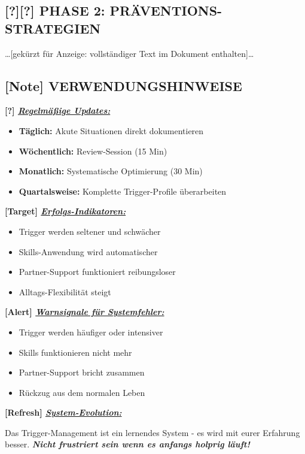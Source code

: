 \hypertarget{phase-2-pruxe4ventions-strategien}{%
\subsection{\texorpdfstring{[?][?] \textbf{PHASE 2: PRÄVENTIONS-STRATEGIEN}}{[?][?] PHASE 2: PRÄVENTIONS-STRATEGIEN}}\label{phase-2-pruxe4ventions-strategien}}

\ldots{[}gekürzt für Anzeige: vollständiger Text im Dokument enthalten{]}\ldots{}

\hypertarget{verwendungshinweise}{%
\subsection{\texorpdfstring{[Note] \textbf{VERWENDUNGSHINWEISE}}{[Note] VERWENDUNGSHINWEISE}}\label{verwendungshinweise}}

\textbf{[?] \emph{\ul{Regelmäßige Updates:}}}

\begin{itemize}
\tightlist
\item
  \textbf{Täglich:} Akute Situationen direkt dokumentieren
\item
  \textbf{Wöchentlich:} Review-Session (15 Min)
\item
  \textbf{Monatlich:} Systematische Optimierung (30 Min)
\item
  \textbf{Quartalsweise:} Komplette Trigger-Profile überarbeiten
\end{itemize}

\textbf{[Target] \emph{\ul{Erfolgs-Indikatoren:}}}

\begin{itemize}
\tightlist
\item
  Trigger werden seltener und schwächer
\item
  Skills-Anwendung wird automatischer
\item
  Partner-Support funktioniert reibungsloser
\item
  Alltags-Flexibilität steigt
\end{itemize}

\textbf{[Alert] \emph{\ul{Warnsignale für Systemfehler:}}}

\begin{itemize}
\tightlist
\item
  Trigger werden häufiger oder intensiver
\item
  Skills funktionieren nicht mehr
\item
  Partner-Support bricht zusammen
\item
  Rückzug aus dem normalen Leben
\end{itemize}

\textbf{[Refresh] \emph{\ul{System-Evolution:}}}

Das Trigger-Management ist ein lernendes System - es wird mit eurer Erfahrung besser. \emph{\textbf{Nicht frustriert sein wenn es anfangs holprig läuft!}}
